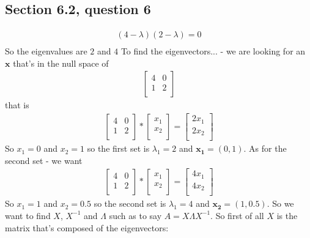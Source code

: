 \documentclass[a4paper,11pt]{article}
\newcommand{\mybf}[1]{\boldsymbol{#1}}
\begin{document}
\subsection*{Section 6.2, question 6}
\begin{align*}
(4-\lambda)(2-\lambda)=0 \\
\end{align*}
So the eigenvalues are $2$ and $4$
To find the eigenvectors... - 
we are looking for an $\mybf{x}$ that's in the null space of 
\begin{align*}
\begin{bmatrix}
4 & 0 \\
1 & 2 \\
\end{bmatrix}
\end{align*}
that is 
\begin{align*}
\begin{bmatrix}
4 & 0 \\
1 & 2 \\
\end{bmatrix}
*
\begin{bmatrix}
x_1  \\
x_2  \\
\end{bmatrix}
=
\begin{bmatrix}
2x_1  \\
2x_2  \\
\end{bmatrix}
\end{align*}
So $x_1=0$ and $x_2=1$ so the first set is $\lambda_1=2$ and $\mybf{x_1}=(0,1)$.
As for the second set - we want
\begin{align*}
\begin{bmatrix}
4 & 0 \\
1 & 2 \\
\end{bmatrix}
*
\begin{bmatrix}
x_1  \\
x_2  \\
\end{bmatrix}
=
\begin{bmatrix}
4x_1  \\
4x_2  \\
\end{bmatrix}
\end{align*}
So $x_1=1$ and $x_2=0.5$ so the second set is $\lambda_1=4$ and $\mybf{x_2}=(1,0.5)$.
So we want to find $X$, $X^{-1}$ and $\Lambda$ such as to say $A=X \Lambda X^{-1}$.
So first of all $X$ is the matrix that's composed of the eigenvectors: 
\end{document}

